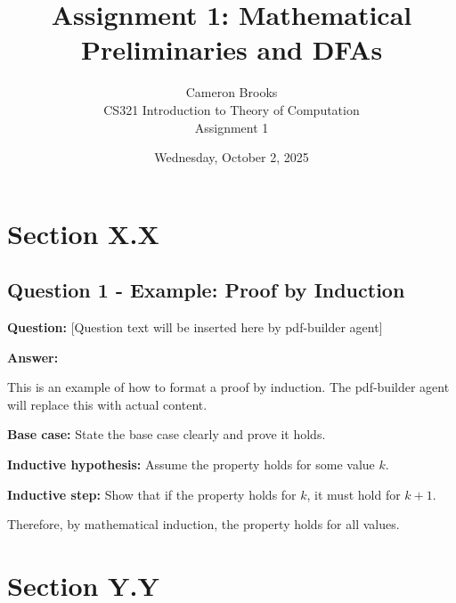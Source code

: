 \documentclass[12pt]{article}
\title{Assignment 1: Mathematical Preliminaries and DFAs}
\author{Cameron Brooks \\
        CS321 Introduction to Theory of Computation \\
        Assignment 1}
\date{Wednesday, October 2, 2025}
\begin{document}
\maketitle
\thispagestyle{empty}

\newpage
\tableofcontents
\newpage


\section{Section X.X}

\subsection{Question 1 - Example: Proof by Induction}
\textbf{Question:} [Question text will be inserted here by pdf-builder agent]

\textbf{Answer:}

This is an example of how to format a proof by induction. The pdf-builder agent will replace this with actual content.

\textbf{Base case:} State the base case clearly and prove it holds.

\textbf{Inductive hypothesis:} Assume the property holds for some value $k$.

\textbf{Inductive step:} Show that if the property holds for $k$, it must hold for $k+1$.

Therefore, by mathematical induction, the property holds for all values.


\section{Section Y.Y}
\end{document}
